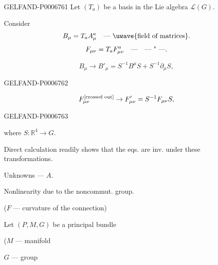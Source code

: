 \begin{GelfandAdjacentEvidence}{GELFAND-P000676}{1}
Let \((T_a)\) be a basis in the Lie algebra \(\mathcal L(G)\).

Consider
\[
B_\mu=T_a A_\mu^a\quad\text{--- }\text{\uwave{field of matrices}.}
\]
\[
F_{\mu\nu}=T_a F_{\mu\nu}^a\quad\text{---\quad--- \textquotedbl{} ---}.
\]

\[
B_\mu\to B'_\mu=S^{-1}B^\mu S+S^{-1}\partial_\mu S,
\]
\end{GelfandAdjacentEvidence}
\begin{GelfandAdjacentEvidence}{GELFAND-P000676}{2}

\[
F_{\mu\nu}^{\text{\scriptsize[crossed out]}}
\to F'_{\mu\nu}=S^{-1}F_{\mu\nu}S,
\]
\end{GelfandAdjacentEvidence}
\begin{GelfandAdjacentEvidence}{GELFAND-P000676}{3}

where \(S:\mathbb R^4\to G\).

Direct calculation readily shows that the eqs. are inv. under these transformations.

Unknowns --- \(A\).

Nonlinearity due to the noncommut. group.

(\(F\) --- curvature of the connection)


Let \((P,M,G)\) be a principal bundle

(\(M\) --- manifold

\(G\) --- group
\end{GelfandAdjacentEvidence}
